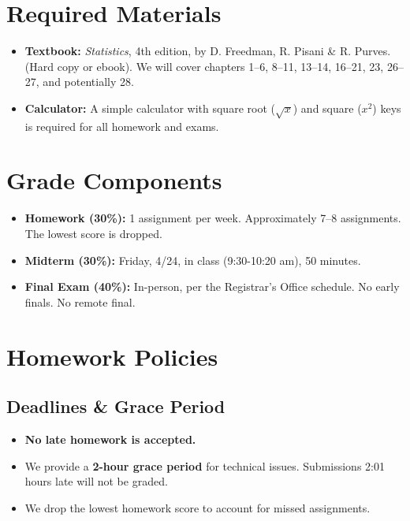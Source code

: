 \documentclass[11pt]{article}
\begin{document}
\section{Required Materials}
\begin{itemize}[leftmargin=*]
    \item \textbf{Textbook:} \textit{Statistics}, 4th edition, by D. Freedman, R. Pisani \& R. Purves. (Hard copy or ebook). We will cover chapters 1--6, 8--11, 13--14, 16--21, 23, 26--27, and potentially 28. 
    \item \textbf{Calculator:} A simple calculator with square root ($\sqrt{x}$) and square ($x^2$) keys is required for all homework and exams.
\end{itemize}

\section{Grade Components}
\begin{itemize}[leftmargin=*]
    \item \textbf{Homework (30\%):} 1 assignment per week. Approximately 7--8 assignments. The lowest score is dropped.
    \item \textbf{Midterm (30\%):} Friday, 4/24, in class (9:30-10:20 am), 50 minutes.
    \item \textbf{Final Exam (40\%):} In-person, per the Registrar's Office schedule. No early finals. No remote final.
\end{itemize}

\section{Homework Policies}
\subsection{Deadlines \& Grace Period}
\begin{itemize}
    \item \textbf{No late homework is accepted.} 
    \item We provide a \textbf{2-hour grace period} for technical issues. Submissions 2:01 hours late will not be graded.
    \item We drop the lowest homework score to account for missed assignments.
\end{itemize}
\end{document}
